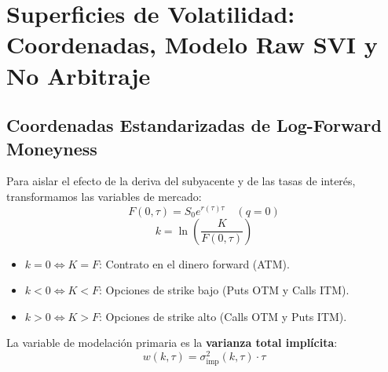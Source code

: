 \documentclass[11pt,a4paper]{article}
\begin{document}
\newpage
\section{Superficies de Volatilidad: Coordenadas, Modelo Raw SVI y No Arbitraje}

\subsection{Coordenadas Estandarizadas de Log-Forward Moneyness}
Para aislar el efecto de la deriva del subyacente y de las tasas de interés, transformamos las variables de mercado:
\begin{equation}
    F(0, \tau) = S_0 e^{r(\tau) \tau} \quad (q = 0)
\end{equation}
\begin{equation}
    k = \ln\left( \frac{K}{F(0, \tau)} \right)
\end{equation}
\begin{itemize}
    \item $k = 0 \iff K = F$: Contrato en el dinero forward (ATM).
    \item $k < 0 \iff K < F$: Opciones de strike bajo (Puts OTM y Calls ITM).
    \item $k > 0 \iff K > F$: Opciones de strike alto (Calls OTM y Puts ITM).
\end{itemize}
La variable de modelación primaria es la \textbf{varianza total implícita}:
\begin{equation}
    w(k, \tau) = \sigma_{\text{imp}}^2(k, \tau) \cdot \tau
\end{equation}
\end{document}
